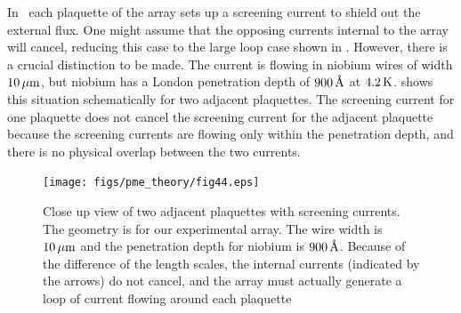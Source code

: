 In \ each plaquette of the array
sets up a screening current to shield out the external flux. 
One might assume that the opposing currents internal to the array
will cancel, reducing this case to the large loop case shown in
. However, there is a 
crucial distinction
to be made. The current is flowing in niobium wires of 
width $10\,\micron$, but niobium has a London penetration depth of
$900\,\angstrom$ at $4.2\,\kelvin$. 
shows this situation schematically for two adjacent plaquettes. 
The screening current for one plaquette does not cancel the 
screening current for the adjacent plaquette because the screening
currents are flowing only within the penetration depth, and there is
no physical overlap between the two currents. 

\begin{figure}[p]
\texttt{[image: figs/pme\_theory/fig44.eps]}
\caption[Close up view to two adjacent plaquettes with screening 
currents.]
{Close up view of two adjacent plaquettes with screening currents. 
The geometry
is for our experimental array. 
The wire width is $10\,\micron$ and the penetration
depth for niobium is $900\,\angstrom$. Because of the difference
of the length scales,
the internal currents (indicated by the arrows) 
do not cancel, and the array
must actually generate a loop of current flowing around each
plaquette}
\label{fig:plaquette_screening_close_up}
\end{figure}



